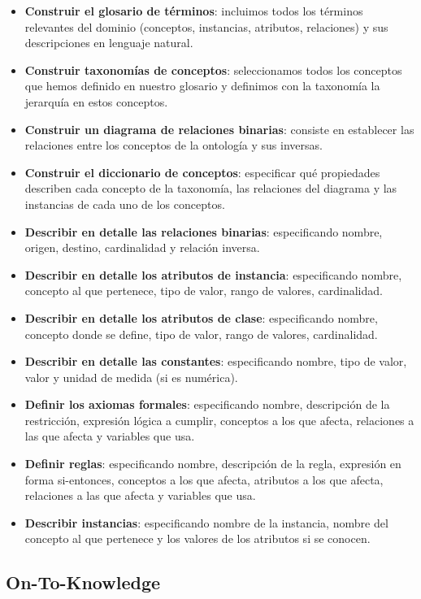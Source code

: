 \begin{itemize}
	\item \textbf{Construir el glosario de términos}: incluimos todos los términos relevantes del dominio (conceptos, instancias, atributos, relaciones) y sus descripciones en lenguaje natural.
	\item \textbf{Construir taxonomías de conceptos}: seleccionamos todos los conceptos que hemos definido en nuestro glosario y definimos con la taxonomía la jerarquía en estos conceptos.
	\item \textbf{Construir un diagrama de relaciones binarias}: consiste en establecer las relaciones entre los conceptos de la ontología y sus inversas.
	\item \textbf{Construir el diccionario de conceptos}: especificar qué propiedades describen cada concepto de la taxonomía, las relaciones del diagrama y las instancias de cada uno de los conceptos.
	\item \textbf{Describir en detalle las relaciones binarias}: especificando nombre, origen, destino, cardinalidad y relación inversa.
	\item \textbf{Describir en detalle los atributos de instancia}: especificando nombre, concepto al que pertenece, tipo de valor, rango de valores, cardinalidad.
	\item \textbf{Describir en detalle los atributos de clase}: especificando nombre, concepto donde se define, tipo de valor, rango de valores, cardinalidad.
	\item \textbf{Describir en detalle las constantes}: especificando nombre, tipo de valor, valor y unidad de medida (si es numérica).
	\item \textbf{Definir los axiomas formales}: especificando nombre, descripción de la restricción, expresión lógica a cumplir, conceptos a los que afecta, relaciones a las que afecta y variables que usa.
	\item \textbf{Definir reglas}: especificando nombre, descripción de la regla, expresión en forma si-entonces, conceptos a los que afecta, atributos a los que afecta, relaciones a las que afecta y variables que usa.
	\item \textbf{Describir instancias}: especificando nombre de la instancia, nombre del concepto al que pertenece y los valores de los atributos si se conocen.
\end{itemize}

\subsection{On-To-Knowledge}

